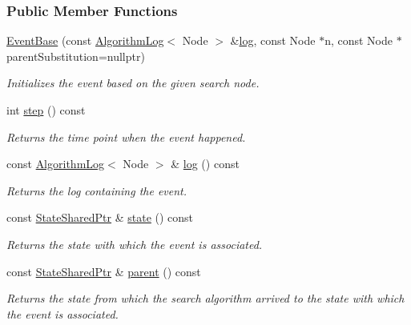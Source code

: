 \subsubsection*{Public Member Functions}
\begin{DoxyCompactItemize}
\item 
\hyperlink{structslb_1_1core_1_1ui_1_1EventBase_a641bed2ef08022f532763268aac71e3a}{Event\+Base} (const \hyperlink{structslb_1_1core_1_1ui_1_1AlgorithmLog}{Algorithm\+Log}$<$ Node $>$ \&\hyperlink{structslb_1_1core_1_1ui_1_1EventBase_a4f6cd3f19f35b8e9dd39aa1a141be99f}{log}, const Node $\ast$n, const Node $\ast$parent\+Substitution=nullptr)
\begin{DoxyCompactList}\small\item\em Initializes the event based on the given search node. \end{DoxyCompactList}\item 
int \hyperlink{structslb_1_1core_1_1ui_1_1EventBase_a23ec95b8b30e74fe830f5bd60d93ed75}{step} () const 
\begin{DoxyCompactList}\small\item\em Returns the time point when the event happened. \end{DoxyCompactList}\item 
const \hyperlink{structslb_1_1core_1_1ui_1_1AlgorithmLog}{Algorithm\+Log}$<$ Node $>$ \& \hyperlink{structslb_1_1core_1_1ui_1_1EventBase_a4f6cd3f19f35b8e9dd39aa1a141be99f}{log} () const 
\begin{DoxyCompactList}\small\item\em Returns the log containing the event. \end{DoxyCompactList}\item 
const \hyperlink{structslb_1_1core_1_1ui_1_1EventBase_a50419d00607aad434bb97138eabe2c94}{State\+Shared\+Ptr} \& \hyperlink{structslb_1_1core_1_1ui_1_1EventBase_a1890daf7f5d663402d2272ba5f41f4d7}{state} () const 
\begin{DoxyCompactList}\small\item\em Returns the state with which the event is associated. \end{DoxyCompactList}\item 
const \hyperlink{structslb_1_1core_1_1ui_1_1EventBase_a50419d00607aad434bb97138eabe2c94}{State\+Shared\+Ptr} \& \hyperlink{structslb_1_1core_1_1ui_1_1EventBase_a9de09dd2012486bbf7a486b12c161ec2}{parent} () const 
\begin{DoxyCompactList}\small\item\em Returns the state from which the search algorithm arrived to the state with which the event is associated. \end{DoxyCompactList}\item 

\end{DoxyCompactItemize}
